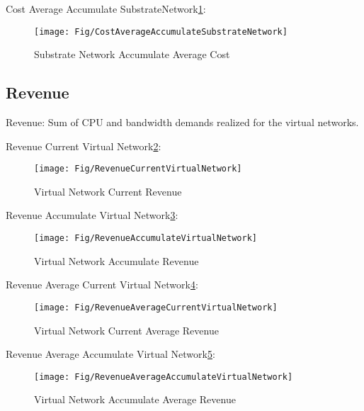 Cost Average Accumulate SubstrateNetwork\ref{fig:CostAverageAccumulateSubstrateNetwork}:
\begin{figure}
  \centering
  \texttt{[image: Fig/CostAverageAccumulateSubstrateNetwork]}\\
  \caption{Substrate Network Accumulate Average Cost }\label{fig:CostAverageAccumulateSubstrateNetwork}
\end{figure}



\subsection{Revenue}
Revenue: Sum of CPU and bandwidth demands realized for the virtual networks.

Revenue Current Virtual Network\ref{fig:RevenueCurrentVirtualNetwork}:
\begin{figure}
  \centering
  \texttt{[image: Fig/RevenueCurrentVirtualNetwork]}\\
  \caption{Virtual Network Current Revenue }\label{fig:RevenueCurrentVirtualNetwork}
\end{figure}

Revenue Accumulate Virtual Network\ref{fig:RevenueAccumulateVirtualNetwork}:
\begin{figure}
  \centering
  \texttt{[image: Fig/RevenueAccumulateVirtualNetwork]}\\
  \caption{Virtual Network Accumulate Revenue }\label{fig:RevenueAccumulateVirtualNetwork}
\end{figure}

Revenue Average Current Virtual Network\ref{fig:RevenueAverageCurrentVirtualNetwork}:
\begin{figure}
  \centering
  \texttt{[image: Fig/RevenueAverageCurrentVirtualNetwork]}\\
  \caption{Virtual Network Current Average Revenue}\label{fig:RevenueAverageCurrentVirtualNetwork}
\end{figure}

Revenue Average Accumulate Virtual Network\ref{fig:RevenueAverageAccumulateVirtualNetwork}:
\begin{figure}
  \centering
  \texttt{[image: Fig/RevenueAverageAccumulateVirtualNetwork]}\\
  \caption{Virtual Network Accumulate Average Revenue}\label{fig:RevenueAverageAccumulateVirtualNetwork}
\end{figure}


